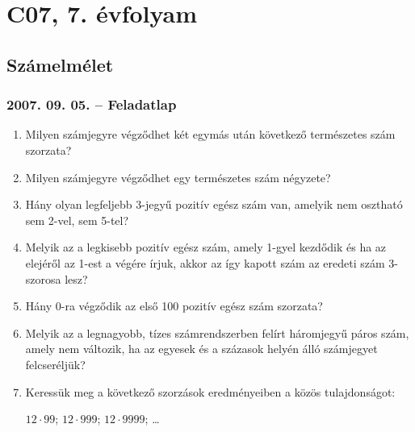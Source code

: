 \chapter{C07, 7. évfolyam}
\section{Számelmélet}





\subsection*{2007. 09. 05. -- Feladatlap}
\begin{enumerate}
\item Milyen számjegyre végződhet két egymás után következő természetes szám szorzata?
\item Milyen számjegyre végződhet egy természetes szám négyzete?
\item Hány olyan legfeljebb 3-jegyű pozitív egész szám van, amelyik nem osztható sem 2-vel, sem 5-tel?
\item Melyik az a legkisebb pozitív egész szám, amely 1-gyel kezdődik és ha az elejéről az 1-est a végére írjuk, akkor az így kapott szám az eredeti szám 3-szorosa lesz?
\item Hány 0-ra végződik az első 100 pozitív egész szám szorzata?
\item Melyik az a legnagyobb, tízes számrendszerben felírt háromjegyű páros szám, amely nem változik, ha az egyesek és a százasok helyén álló számjegyet felcseréljük?
\item Keressük meg a következő szorzások eredményeiben a közös tulajdonságot:

$12\cdot99$; $12\cdot999$; $12\cdot9999$; \ldots
\end{enumerate}



